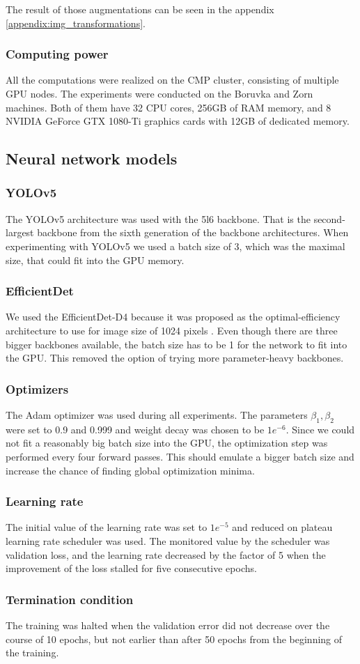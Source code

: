 The result of those augmentations can be seen in the appendix \ref{appendix:img_transformations}.
\subsubsection{Computing power}
All the computations were realized on the CMP cluster, consisting of multiple GPU nodes. The experiments were conducted on the Boruvka and Zorn machines. Both of them have 32 CPU cores, 256GB of RAM memory, and 8 NVIDIA GeForce GTX 1080-Ti graphics cards with 12GB of dedicated memory.

\subsection{Neural network models}
\subsubsection{YOLOv5}
The YOLOv5 architecture was used with the 5l6 backbone. That is the second-largest backbone from the sixth generation of the backbone architectures. When experimenting with YOLOv5 we used a batch size of 3, which was the maximal size, that could fit into the GPU memory.
\subsubsection{EfficientDet}
We used the EfficientDet-D4 because it was proposed as the optimal-efficiency architecture to use for image size of 1024 pixels \cite{Tan2019}. Even though there are three bigger backbones available, the batch size has to be 1 for the network to fit into the GPU. This removed the option of trying more parameter-heavy backbones.

\subsubsection{Optimizers}
The Adam optimizer was used during all experiments. The parameters $\beta_1, \beta_2$ were set to 0.9 and 0.999 and weight decay was chosen to be $1e^{-6}$. Since we could not fit a reasonably big batch size into the GPU, the optimization step was performed every four forward passes. This should emulate a bigger batch size and increase the chance of finding global optimization minima.
\subsubsection{Learning rate}
The initial value of the learning rate was set to $1e^{-5}$ and reduced on plateau learning rate scheduler was used. The monitored value by the scheduler was validation loss, and the learning rate decreased by the factor of 5 when the improvement of the loss stalled for five consecutive epochs.
\subsubsection{Termination condition}
The training was halted when the validation error did not decrease over the course of 10 epochs, but not earlier than after 50 epochs from the beginning of the training.


